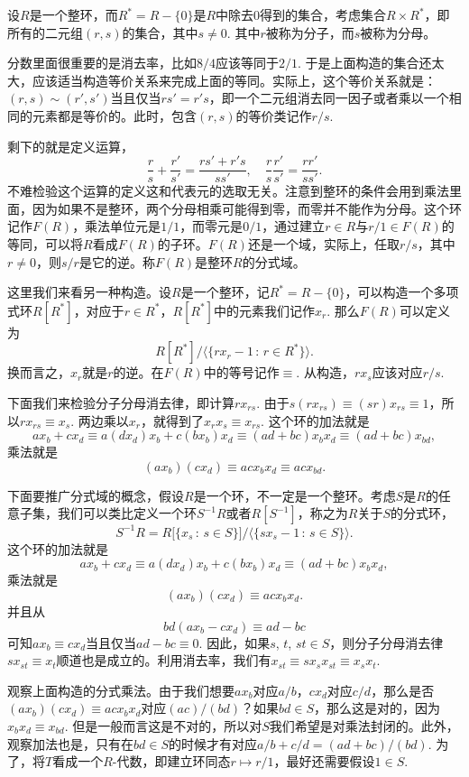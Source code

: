 设$R$是一个整环，而$R^{*}=R-\{0\}$是$R$中除去$0$得到的集合，考虑集合$R\times R^{*}$，即所有的二元组$(r,s)$的集合，其中$s\neq 0$. 其中$r$被称为分子，而$s$被称为分母。

分数里面很重要的是消去率，比如$8/4$应该等同于$2/1$. 于是上面构造的集合还太大，应该适当构造等价关系来完成上面的等同。实际上，这个等价关系就是：$(r,s)\sim (r',s')$当且仅当$rs'=r's$，即一个二元组消去同一因子或者乘以一个相同的元素都是等价的。此时，包含$(r,s)$的等价类记作$r/s$.

剩下的就是定义运算，
\[
	\frac{r}{s}+\frac{r'}{s'}=\frac{rs'+r's}{ss'},\quad \frac{r}{s}\frac{r'}{s'}=\frac{rr'}{ss'}.
\]
不难检验这个运算的定义这和代表元的选取无关。注意到整环的条件会用到乘法里面，因为如果不是整环，两个分母相乘可能得到零，而零并不能作为分母。这个环记作$F(R)$，乘法单位元是$1/1$，而零元是$0/1$，通过建立$r\in R$与$r/1\in F(R)$的等同，可以将$R$看成$F(R)$的子环。$F(R)$还是一个域，实际上，任取$r/s$，其中$r\neq 0$，则$s/r$是它的逆。称$F(R)$是整环$R$的分式域。

\para 这里我们来看另一种构造。设$R$是一个整环，记$R^*=R-\{0\}$，可以构造一个多项式环$R[R^*]$，对应于$r\in R^*$，$R[R^*]$中的元素我们记作$x_r$. 那么$F(R)$可以定义为
\[
	R[R^*]\big/\bigl\langle\{rx_r-1\,:\, r\in R^*\}\bigr\rangle.
\]
换而言之，$x_r$就是$r$的逆。在$F(R)$中的等号记作$\equiv$. 从构造，$rx_s$应该对应$r/s$.

下面我们来检验分子分母消去律，即计算$rx_{rs}$. 由于$s(rx_{rs})\equiv (sr)x_{rs}\equiv 1$，所以$rx_{rs}\equiv x_s$. 两边乘以$x_r$，就得到了$x_rx_s\equiv x_{rs}$. 这个环的加法就是
\[
	ax_{b}+cx_d\equiv a(dx_d)x_{b}+c(bx_{b})x_d\equiv (ad+bc)x_bx_d \equiv (ad+bc)x_{bd},
\]
乘法就是
\[
	(ax_{b})(cx_d)\equiv acx_bx_d\equiv acx_{bd}.
\]

\para 下面要推广分式域的概念，假设$R$是一个环，不一定是一个整环。考虑$S$是$R$的任意子集，我们可以类比定义一个环$S^{-1}R$或者$R[S^{-1}]$，称之为$R$关于$S$的分式环，
\[
	S^{-1}R=R\bigl[\{x_s\,:\, s\in S\}\bigr]\big/\bigl\langle\{sx_s-1\,:\, s\in S\}\bigr\rangle.
\]
这个环的加法就是
\[
	ax_{b}+cx_d\equiv a(dx_d)x_{b}+c(bx_{b})x_d\equiv (ad+bc)x_bx_d,
\]
乘法就是
\[
	(ax_{b})(cx_d)\equiv acx_bx_d.
\]
并且从
\[
	bd(ax_{b}-cx_d)\equiv ad-bc
\]
可知$ax_{b}\equiv cx_d$当且仅当$ad-bc\equiv 0$. 因此，如果$s$, $t$, $st\in S$，则分子分母消去律$sx_{st}\equiv x_t$顺道也是成立的。利用消去率，我们有$x_{st}\equiv sx_s x_{st}\equiv x_s x_t$.

观察上面构造的分式乘法。由于我们想要$ax_b$对应$a/b$，$cx_d$对应$c/d$，那么是否$(ax_{b})(cx_d)\equiv acx_bx_d$对应$(ac)/(bd)$？如果$bd\in S$，那么这是对的，因为$x_bx_d\equiv x_{bd}$. 但是一般而言这是不对的，所以对$S$我们希望是对乘法封闭的。此外，观察加法也是，只有在$bd\in S$的时候才有对应$a/b+c/d=(ad+bc)/(bd)$. 为了，将$T$看成一个$R$-代数，即建立环同态$r\mapsto r/1$，最好还需要假设$1\in S$.

